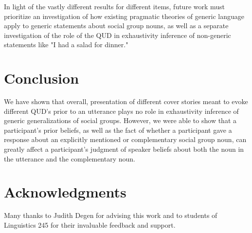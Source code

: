 \documentclass[11pt,a4paper]{article}
\begin{document}
In light of the vastly different results for different items, future work must prioritize an investigation of how existing pragmatic theories of generic language apply to generic statements about social group nouns, as well as a separate investigation of the role of the QUD in exhaustivity inference of non-generic statements like "I had a salad for dinner."

\section{Conclusion}
We have shown that overall, presentation of different cover stories meant to evoke different QUD's prior to an utterance plays no role in exhaustivity inference of generic generalizations of social groups. However, we were able to show that a participant's prior beliefs, as well as the fact of whether a participant gave a response about an explicitly mentioned or complementary social group noun, can greatly affect a participant's judgment of speaker beliefs about both the noun in the utterance and the complementary noun. 

\section*{Acknowledgments}

Many thanks to Judith Degen for advising this work and to students of Linguistics 245 for their invaluable feedback and support.

%
%


\end{document}
